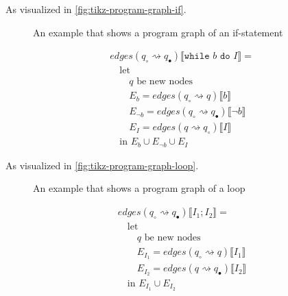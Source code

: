 As visualized in \autoref{fig:tikz-program-graph-if}.

\begin{figure}[htb!]
    \center
    
    \caption{An example that shows a program graph of an if-statement}
    \label{fig:tikz-program-graph-if}
\end{figure}

\begin{equation}
    \begin{aligned}
        &edges(q_\circ \rightsquigarrow q_\bullet) \llbracket \texttt{while } b \texttt{ do } I \rrbracket = \\
        &\quad \text{let } \\
        &\quad\quad q \text{ be new nodes} \\
        &\quad\quad E_{b} = edges(q_\circ \rightsquigarrow q) \llbracket b \rrbracket \\
        &\quad\quad E_{\neg b} = edges(q_\circ \rightsquigarrow q_\bullet) \llbracket \neg b \rrbracket \\
        &\quad\quad E_{I} = edges(q \rightsquigarrow q_\circ) \llbracket I \rrbracket \\
        &\quad \text{in } E_{b} \cup E_{\neg b} \cup E_{I}
    \end{aligned}\label{eq:equation9}
\end{equation}

As visualized in \autoref{fig:tikz-program-graph-loop}.

\begin{figure}[htb!]
    \center
    
    \caption{An example that shows a program graph of a loop}
    \label{fig:tikz-program-graph-loop}
\end{figure}

\begin{equation}
    \begin{aligned}
        &edges(q_\circ \rightsquigarrow q_\bullet) \llbracket I_1; I_2 \rrbracket = \\
        &\quad \text{let } \\
        &\quad\quad q \text{ be new nodes} \\
        &\quad\quad E_{I_1} = edges(q_\circ \rightsquigarrow q) \llbracket I_1 \rrbracket \\
        &\quad\quad E_{I_2} = edges(q \rightsquigarrow q_\bullet) \llbracket I_2 \rrbracket \\
        &\quad \text{in } E_{I_1} \cup E_{I_2}
    \end{aligned}\label{eq:equation10}
\end{equation}

